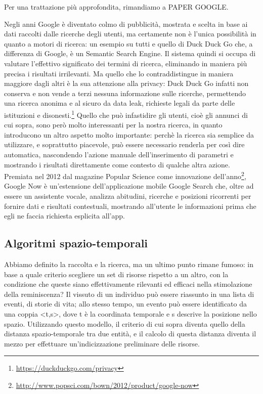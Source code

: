 \documentclass[sigproc-sp.tex]{subfiles}
\begin{document}
Per una trattazione più approfondita, rimandiamo a PAPER GOOGLE.

Negli anni Google è diventato colmo di pubblicità, mostrata e scelta in base ai dati raccolti dalle ricerche degli utenti, ma certamente non è l’unica possibilità in quanto a motori di ricerca: un esempio su tutti e quello di Duck Duck Go che, a differenza di Google, è un Semantic Search Engine. Il sistema quindi si occupa di valutare l’effettivo significato dei termini di ricerca, eliminando in maniera più precisa i risultati irrilevanti. Ma quello che lo contraddistingue in maniera maggiore dagli altri è la sua attenzione alla privacy: Duck Duck Go infatti non conserva e non vende a terzi nessuna informazione sulle ricerche, permettendo una ricerca anonima e al sicuro da data leak, richieste legali da parte delle istituzioni e disonesti.\footnote{\url{https://duckduckgo.com/privacy}}
Quello che può infastidire gli utenti, cioè gli annunci di cui sopra, sono però molto interessanti per la nostra ricerca, in quanto introducono un altro aspetto molto importante: perchè la ricerca sia semplice da utilizzare, e soprattutto piacevole, può essere necessario renderla per così dire automatica, nascondendo l’azione manuale dell’inserimento di parametri e mostrando i risultati direttamente come contesto di qualche altra azione. Premiata nel 2012 dal magazine Popular Science come innovazione dell’anno\footnote{\url{http://www.popsci.com/bown/2012/product/google-now}}, Google Now è un’estensione dell’applicazione mobile Google Search che, oltre ad essere un assistente vocale, analizza abitudini, ricerche e posizioni ricorrenti per fornire dati e risultati contestuali, mostrando all’utente le informazioni prima che egli ne faccia richiesta esplicita all’app.

\subsection{Algoritmi spazio-temporali}
Abbiamo definito la raccolta e la ricerca, ma un ultimo punto rimane fumoso: in base a quale criterio scegliere un set di risorse rispetto a un altro, con la condizione che queste siano effettivamente rilevanti ed efficaci nella stimolazione della reminiscenza? Il vissuto di un individuo può essere riassunto in una lista di eventi, di storie di vita; allo stesso tempo, un evento può essere identificato da una coppia <t,s>, dove t è la coordinata temporale e s descrive la posizione nello spazio. Utilizzando questo modello, il criterio di cui sopra diventa quello della distanza spazio-temporale tra due entità, e il calcolo di questa distanza diventa il mezzo per effettuare un’indicizzazione preliminare delle risorse.
\end{document}
